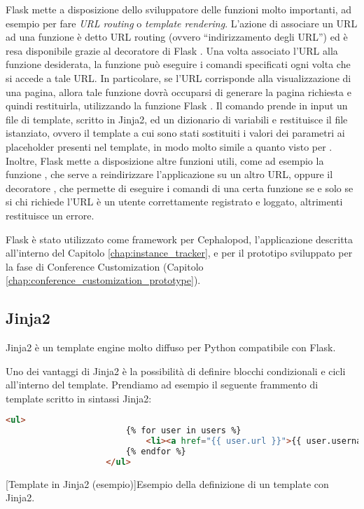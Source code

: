             Flask mette a disposizione dello sviluppatore delle funzioni molto importanti, ad esempio per fare \textit{\ac{URL} routing} o \textit{template rendering}. L'azione di associare un \ac{URL} ad una funzione è detto \ac{URL} routing (ovvero ``indirizzamento degli \ac{URL}'') ed è resa disponibile grazie al decoratore di Flask . Una volta associato l'\ac{URL} alla funzione desiderata, la funzione può eseguire i comandi specificati ogni volta che si accede a tale \ac{URL}. In particolare, se l'\ac{URL} corrisponde alla visualizzazione di una pagina, allora tale funzione dovrà occuparsi di generare la pagina richiesta e quindi restituirla, utilizzando la funzione Flask . Il comando  prende in input un file di template, scritto in Jinja2, ed un dizionario di variabili e restituisce il file istanziato, ovvero il template a cui sono stati sostituiti i valori dei parametri ai placeholder presenti nel template, in modo molto simile a quanto visto per . Inoltre, Flask mette a disposizione altre funzioni utili, come ad esempio la funzione , che serve a reindirizzare l'applicazione su un altro \ac{URL}, oppure il decoratore , che permette di eseguire i comandi di una certa funzione se e solo se si chi richiede l'\ac{URL} è un utente correttamente registrato e loggato, altrimenti restituisce un errore.
            
            Flask è stato utilizzato come framework per Cephalopod, l'applicazione descritta all'interno del Capitolo \ref{chap:instance_tracker}, e per il prototipo sviluppato per la fase di Conference Customization (Capitolo \ref{chap:conference_customization_prototype}).
            
        \subsection{Jinja2} \label{subsec:p;sl;jinja2}
        
            Jinja2 è un template engine molto diffuso per Python compatibile con Flask.
            
            Uno dei vantaggi di Jinja2 è la possibilità di definire blocchi condizionali e cicli all'interno del template. Prendiamo ad esempio il seguente frammento di template scritto in sintassi Jinja2:
            
            \begin{center}
                \begin{lstlisting}[language=html, gobble=18]
                    <ul>
                        {% for user in users %}
                            <li><a href="{{ user.url }}">{{ user.username }}</a></li>
                        {% endfor %}
                    </ul>
                \end{lstlisting}
                \captionsetup{textformat=empty,labelformat=empty} \vspace{-2em}
                [Template in Jinja2 (esempio)]{Esempio della definizione di un template con Jinja2.}
            \end{center}
            
